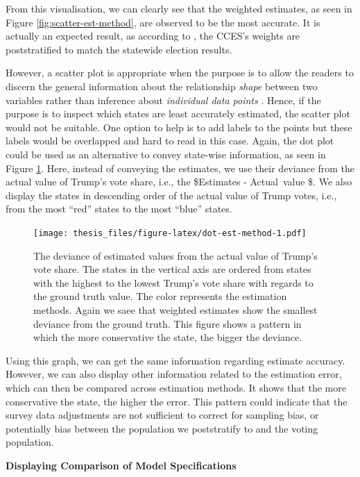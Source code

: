 \documentclass{monashthesis}
\begin{document}
From this visualisation, we can clearly see that the weighted estimates, as seen in Figure \ref{fig:scatter-est-method}, are observed to be the most accurate. It is actually an expected result, as according to \textcite{cces_data}, the CCES's weights are poststratified to match the statewide election results.

However, a scatter plot is appropriate when the purpose is to allow the readers to discern the general information about the relationship \emph{shape} between two variables rather than inference about \emph{individual data points} \autocite{saundra}. Hence, if the purpose is to inspect which states are least accurately estimated, the scatter plot would not be suitable. One option to help is to add labels to the points but these labels would be overlapped and hard to read in this case. Again, the dot plot could be used as an alternative to convey state-wise information, as seen in Figure \ref{fig:dot-est-method}. Here, instead of conveying the estimates, we use their deviance from the actual value of Trump's vote share, i.e., the \$Estimates - Actual~value \$. We also display the states in descending order of the actual value of Trump votes, i.e., from the most ``red'' states to the most ``blue'' states.

\begin{figure}
\centering
\texttt{[image: thesis\_files/figure-latex/dot-est-method-1.pdf]}
\caption{\label{fig:dot-est-method}The deviance of estimated values from the actual value of Trump's vote share. The states in the vertical axis are ordered from states with the highest to the lowest Trump's vote share with regards to the ground truth value. The color represents the estimation methods. Again we saee that weighted estimates show the smallest deviance from the ground truth. This figure shows a pattern in which the more conservative the state, the bigger the deviance.}
\end{figure}

Using this graph, we can get the same information regarding estimate accuracy. However, we can also display other information related to the estimation error, which can then be compared across estimation methods. It shows that the more conservative the state, the higher the error. This pattern could indicate that the survey data adjustments are not sufficient to correct for sampling bias, or potentially bias between the population we poststratify to and the voting population.

\textbf{Displaying Comparison of Model Specifications}
\end{document}
